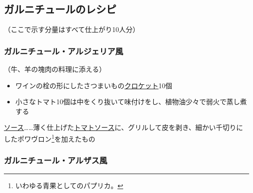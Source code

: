 \hypertarget{garnitures-recettes}{%
\subsection{ガルニチュールのレシピ}\label{garnitures-recettes}}


\begin{center}
\medlarge（ここで示す分量はすべて仕上がり10人分）
\end{center}
\normalsize
\begin{recette}
\hypertarget{garniture-algerienne}{%
\subsubsection{ガルニチュール・アルジェリア風}\label{garniture-algerienne}}



（牛、羊の塊肉の料理に添える）

\begin{itemize}
\item
  ワインの栓の形にしたさつまいもの\protect\hyperlink{croquettes}{クロケット}10個
\item
  小さなトマト10個は中をくり抜いて味付けをし、植物油少々で弱火で蒸し煮する
\end{itemize}

\ul{ソース}\ldots{}\ldots{}薄く仕上げた\protect\hyperlink{sauce-tomate}{トマトソース}に、グリルして皮を剥き、細かい千切りにしたポワヴロン\footnote{いわゆる青果としてのパプリカ。}を加えたもの

\hypertarget{garniture-alsacienne}{%
\subsubsection{ガルニチュール・アルザス風}\label{garniture-alsacienne}}




\end{recette}
